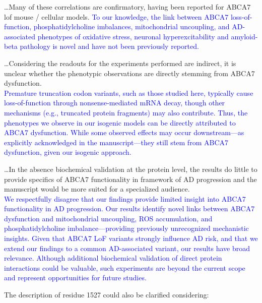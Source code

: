 \dots Many of these correlations are confirmatory, having been reported for ABCA7 lof mouse / cellular models. 
\textcolor{blue}{To our knowledge, the link between ABCA7 loss-of-function, phosphatidylcholine imbalances, mitochondrial uncoupling, and AD-associated phenotypes of oxidative stress, neuronal hyperexcitability and amyloid-beta pathology is novel and have not been previously reported.}

\dots Considering the readouts for the experiments performed are indirect, it is unclear whether the phenotypic observations are directly stemming from ABCA7 dysfunction.\\ 
\textcolor{blue}{Premature truncation codon variants, such as those studied here, typically cause loss-of-function through nonsense-mediated mRNA decay, though other mechanisms (e.g., truncated protein fragments) may also contribute. Thus, the phenotypes we observe in our isogenic models can be directly attributed to ABCA7 dysfunction. While some observed effects may occur downstream—as explicitly acknowledged in the manuscript—they still stem from ABCA7 dysfunction, given our isogenic approach.}

\dots In the absence biochemical validation at the protein level, the results do little to provide specifics of ABCA7 functionality in framework of AD progression and the manuscript would be more suited for a specialized audience.\\ 
\textcolor{blue}{We respectfully disagree that our findings provide limited insight into ABCA7 functionality in AD progression. Our results identify novel links between ABCA7 dysfunction and mitochondrial uncoupling, ROS accumulation, and phosphatidylcholine imbalance—providing previously unrecognized mechanistic insights. Given that ABCA7 LoF variants strongly influence AD risk, and that we extend our findings to a common AD-associated variant, our results have broad relevance. Although additional biochemical validation of direct protein interactions could be valuable, such experiments are beyond the current scope and represent opportunities for future studies.}

The description of residue 1527 could also be clarified considering:

